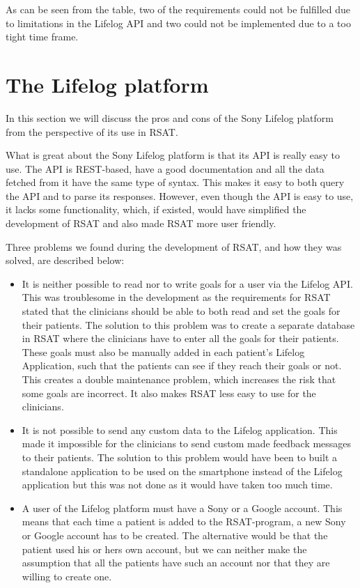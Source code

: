 \documentclass{cslthse-msc}
\begin{document}
As can be seen from the table, two of the requirements could not be fulfilled due to limitations in the Lifelog API and two could not be implemented due to a too tight time frame. 

\section{The Lifelog platform}
\label{sec:lifelogproblem}


In this section we will discuss the pros and cons of the Sony Lifelog platform from the perspective of its use in RSAT. 

What is great about the Sony Lifelog platform is that its API is really easy to use. The API is REST-based, have a good documentation and all the data fetched from it have the same type of syntax. This makes it easy to both query the API and to parse its responses. However, even though the API is easy to use, it lacks some functionality, which, if existed, would have simplified the development of RSAT and also made RSAT more user friendly. 

Three problems we found during the development of RSAT, and how they was solved, are described below:

\begin{itemize}

\item It is neither possible to read nor to write goals for a user via the Lifelog API. This was troublesome in the development as the requirements for RSAT stated that the clinicians should be able to both read and set the goals for their patients. The solution to this problem was to create a separate database in RSAT where the clinicians have to enter all the goals for their patients. These goals must also be manually added in each patient’s Lifelog Application, such that the patients can see if they reach their goals or not. This creates a double maintenance problem, which increases the risk that some goals are incorrect. It also makes RSAT less easy to use for the clinicians. 

\item It is not possible to send any custom data to the Lifelog application. This made it impossible for the clinicians to send custom made feedback messages to their patients. The solution to this problem would have been to built a standalone application to be used on the smartphone instead of the Lifelog application but this was not done as it would have taken too much time. 

\item A user of the Lifelog platform must have a Sony or a Google account. This means that each time a patient is added to the RSAT-program, a new Sony or Google account has to be created. The alternative would be that the patient used his or hers own account, but we can neither make the assumption that all the patients have such an account nor that they are willing to create one. 

\end{itemize}
\end{document}
